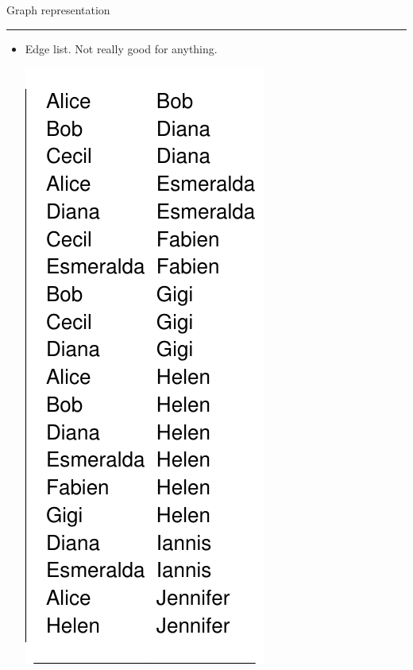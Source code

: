 \documentclass[landscape,fleqno]{foils}
\newcommand{\stitle}[1]{{\color{blue}\Large #1\par\vspace*{10pt}\hrule}}
\newenvironment{narrow}[2]{%
  \begin{list}{}{%
      \setlength{\topsep}{0pt}%
      \setlength{\leftmargin}{#1}%
      \setlength{\rightmargin}{#2}%
      \setlength{\listparindent}{\parindent}%
      \setlength{\itemindent}{\parindent}%
      \setlength{\parsep}{\parskip}}%
    \item[]}{\end{list}}
\begin{document}
\newpage
\stitle{Graph representation}
\begin{narrow}{0cm}{15cm}
\begin{itemize}
\item Edge list. Not really good for anything.
\begin{center}
  \includegraphics{edgelist}
\end{center}
\end{itemize}
\end{narrow}
\end{document}
